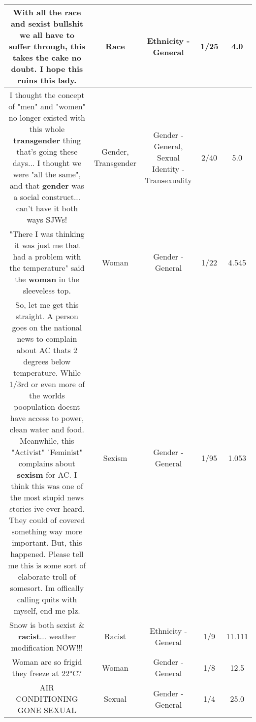 \documentclass[11pt]{article}
\newlength\mylength
\begin{document}
\begin{center}
\begin{longtable}{|C{.65\mylength}|C{.30\mylength}|C{.12\mylength}|C{.12\mylength}|C{.12\mylength}|}
  \small With all the \textbf{race} and sexist bullshit we all have to suffer through, this takes the cake no doubt. I hope this ruins this lady.\normalsize   & Race & Ethnicity - General & 1/25 & 4.0 \\  \hline
  \small I thought the concept of "men" and "women" no longer existed with this whole \textbf{transgender} thing that's going these days... I thought we were "all the same", and that \textbf{gender} was a social construct... can't have it both ways SJWs!\normalsize   & Gender, Transgender & Gender - General, Sexual Identity - Transexuality & 2/40 & 5.0 \\  \hline
  \small "There I was thinking it was just me that had a problem with the temperature" said the \textbf{woman} in the sleeveless top.\normalsize   & Woman & Gender - General & 1/22 & 4.545 \\  \hline
  \small So, let me get this straight. A person goes on the national news to complain about AC thats 2 degrees below temperature. While 1/3rd or even more of the worlds poopulation doesnt have access to power, clean water and food. Meanwhile, this "Activist" "Feminist" complains about \textbf{sexism} for AC. I think this was one of the most stupid news stories ive ever heard. They could of covered something way more important. But, this happened. Please tell me this is some sort of elaborate troll of somesort. Im offically calling quits with myself, end me plz.\normalsize   & Sexism & Gender - General & 1/95 & 1.053 \\  \hline
  \small Snow is both sexist \& \textbf{racist}... weather modification NOW!!!\normalsize   & Racist & Ethnicity - General & 1/9 & 11.111 \\  \hline
  \small Woman are so frigid they freeze at 22°C?\normalsize   & Woman & Gender - General & 1/8 & 12.5 \\  \hline
  \small AIR CONDITIONING GONE SEXUAL\normalsize   & Sexual & Gender - General & 1/4 & 25.0 \\  \hline

\end{longtable}
\end{center}
\end{document}
